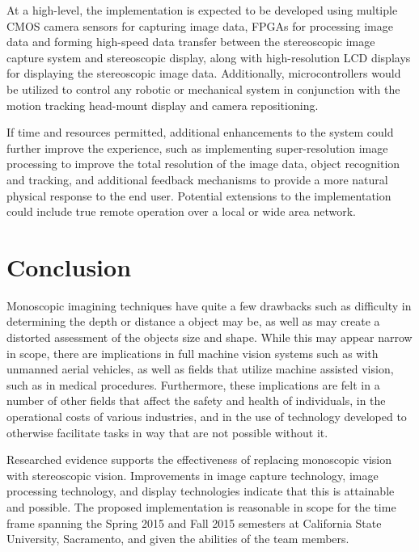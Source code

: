 \documentclass[12pt, journal]{IEEEtran}
\begin{document}
At a high-level, the implementation is expected to be developed using multiple CMOS camera sensors for capturing image data, FPGAs for processing image data and forming high-speed data transfer between the stereoscopic image capture system and stereoscopic display, along with high-resolution LCD displays for displaying the stereoscopic image data.  Additionally, microcontrollers would be utilized to control any robotic or mechanical system in conjunction with the motion tracking head-mount display and camera repositioning.

If time and resources permitted, additional enhancements to the system could further improve the experience, such as implementing super-resolution image processing to improve the total resolution of the image data, object recognition and tracking, and additional feedback mechanisms to provide a more natural physical response to the end user.  Potential extensions to the implementation could include true remote operation over a local or wide area network.

\section{Conclusion}
Monoscopic imagining techniques have quite a few drawbacks such as difficulty in determining the depth or distance a object may be, as well as may create a distorted assessment of the objects size and shape. While this may appear narrow in scope, there are implications in full machine vision systems such as with unmanned aerial vehicles, as well as fields that utilize machine assisted vision, such as in medical procedures.  Furthermore, these implications are felt in a number of other fields that affect the safety and health of individuals, in the operational costs of various industries, and in the use of technology developed to otherwise facilitate tasks in way that are not possible without it.

Researched evidence supports the effectiveness of replacing monoscopic vision with stereoscopic vision.  Improvements in image capture technology, image processing technology, and display technologies indicate that this is attainable and possible.  The proposed implementation is reasonable in scope for the time frame spanning the Spring 2015 and Fall 2015 semesters at California State University, Sacramento, and given the abilities of the team members.


\end{document}
